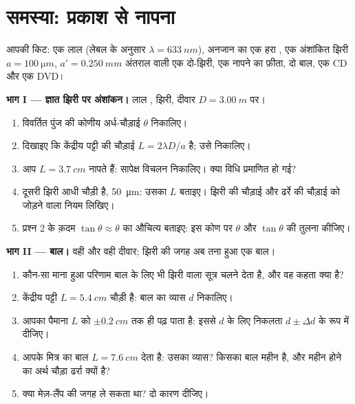 \section{समस्या: प्रकाश से नापना}

\begin{problem}
\label{pb:g12:light-as-wave:1}
आपकी किट: एक लाल  (लेबल के अनुसार $\lambda = \qty{633}{nm}$), अनजान
 का एक हरा , एक अंशांकित झिरी $a = \qty{100}{\micro m}$,
$a' =
\qty{0.250}{mm}$ अंतराल वाली एक दो-झिरी, एक नापने का फ़ीता, दो बाल, एक CD और एक DVD।

\medskip
\noindent\textbf{भाग I --- ज्ञात झिरी पर अंशांकन।}
लाल , झिरी, दीवार $D = \qty{3.00}{m}$ पर।
\begin{enumerate}
  \item विवर्तित पुंज की कोणीय अर्ध-चौड़ाई $\theta$ निकालिए।
  \item दिखाइए कि केंद्रीय पट्टी की चौड़ाई $L = 2\lambda D/a$ है; उसे निकालिए।
  \item आप $L = \qty{3.7}{cm}$ नापते हैं: सापेक्ष विचलन निकालिए। क्या विधि प्रमाणित हो
        गई?
  \item दूसरी झिरी आधी चौड़ी है, \qty{50}{\micro m}: उसका $L$ बताइए। झिरी की चौड़ाई
        और ढर्रे की चौड़ाई को जोड़ने वाला नियम लिखिए।
  \item प्रश्न 2 के क़दम $\tan\theta \approx \theta$ का औचित्य बताइए: इस कोण पर $\theta$ और
        $\tan\theta$ की तुलना कीजिए।
\end{enumerate}

\medskip
\noindent\textbf{भाग II --- बाल।} वही  और वही दीवार; झिरी की
जगह अब तना हुआ एक बाल।
\begin{enumerate}[resume]
  \item कौन-सा माना हुआ परिणाम बाल के लिए भी झिरी वाला सूत्र चलने देता है,
        और वह कहता क्या है?
  \item केंद्रीय पट्टी $L = \qty{5.4}{cm}$ चौड़ी है: बाल का व्यास $d$ निकालिए।
  \item आपका पैमाना $L$ को $\pm\qty{0.2}{cm}$ तक ही पढ़ पाता है: इससे $d$ के लिए
        निकलता  $d \pm \Delta d$ के रूप में दीजिए।
  \item आपके मित्र का बाल $L = \qty{7.6}{cm}$ देता है: उसका व्यास? किसका बाल महीन है, और
        महीन होने का अर्थ चौड़ा ढर्रा क्यों है?
  \item क्या मेज़-लैंप  की जगह ले सकता था? दो कारण दीजिए।
\end{enumerate}


\end{problem}
